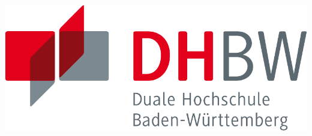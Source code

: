 

\begin{titlepage}
	\vspace*{-2cm}
	\begin{minipage}[c]{.27\textwidth}
	\end{minipage}
	\hfill
	\begin{minipage}[c]{.27\textwidth}
		\centering
		\includegraphics[width=\linewidth,keepaspectratio]{images/cover/DHBW-Logo.pdf}
	\end{minipage}
	\begin{center}
		\doublespacing{
		\vspace*{30mm}	{\textsf{\Large {\documentTitle}}}}\\
		\vspace{12mm}	{\large\textsf{\textbf{\scshape {\documentTypePhrase}}}}\\
		

\end{center}
\end{titlepage}
